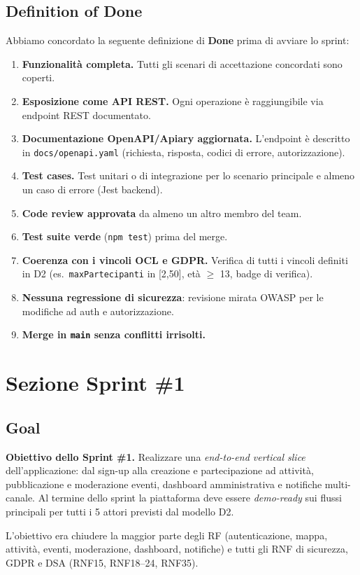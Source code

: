 \documentclass[11pt,a4paper]{article}
\newcommand{\code}[1]{\texttt{\small#1}}
\begin{document}
  \subsection{Definition of Done}
  Abbiamo concordato la seguente definizione di \textbf{Done} prima di avviare lo sprint:
  \begin{enumerate}
    \item \textbf{Funzionalit\`{a} completa.} Tutti gli scenari di accettazione concordati sono coperti.
    \item \textbf{Esposizione come API REST.} Ogni operazione \`{e} raggiungibile via endpoint REST documentato.
    \item \textbf{Documentazione OpenAPI/Apiary aggiornata.} L'endpoint \`{e} descritto in
    \code{docs/openapi.yaml} (richiesta, risposta, codici di errore, autorizzazione).
    \item \textbf{Test cases.} Test unitari o di integrazione per lo scenario principale e almeno
    un caso di errore (Jest backend).
    \item \textbf{Code review approvata} da almeno un altro membro del team.
    \item \textbf{Test suite verde} (\code{npm test}) prima del merge.
    \item \textbf{Coerenza con i vincoli OCL e GDPR.} Verifica di tutti i vincoli definiti in D2
    (es.\ \code{maxPartecipanti} in [2,50], et\`{a} $\geq$ 13, badge di verifica).
    \item \textbf{Nessuna regressione di sicurezza}: revisione mirata OWASP per le modifiche
    ad auth e autorizzazione.
    \item \textbf{Merge in \code{main} senza conflitti irrisolti.}
  \end{enumerate}

  \section{Sezione Sprint \#1}

  \subsection{Goal}
  \begin{tcolorbox}[callout]
  \textbf{Obiettivo dello Sprint \#1.} Realizzare una \emph{end-to-end vertical slice}
  dell'applicazione: dal sign-up alla creazione e partecipazione ad attivit\`{a}, pubblicazione
  e moderazione eventi, dashboard amministrativa e notifiche multi-canale. Al termine dello sprint
  la piattaforma deve essere \emph{demo-ready} sui flussi principali per tutti i 5 attori
  previsti dal modello D2.
  \end{tcolorbox}
  L'obiettivo era chiudere la maggior parte degli RF (autenticazione, mappa, attivit\`{a},
  eventi, moderazione, dashboard, notifiche) e tutti gli RNF di sicurezza, GDPR e DSA
  (RNF15, RNF18--24, RNF35).
\end{document}
